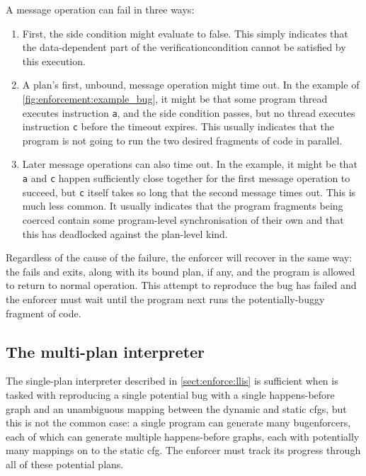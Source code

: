 A message operation can fail in three ways:
\begin{enumerate}
\item
  First, the side condition might evaluate to false.  This simply
  indicates that the data-dependent part of the
  \gls{verificationcondition} cannot be satisfied by this execution.

\item
  A plan's first, unbound, message operation might time out.  In the
  example of \autoref{fig:enforcement:example_bug}, it might be that
  some program thread executes instruction \texttt{a}, and the side
  condition passes, but no thread executes instruction \texttt{c}
  before the timeout expires.  This usually indicates that the program
  is not going to run the two desired fragments of code in parallel.

\item
  Later message operations can also time out.  In the example, it
  might be that \texttt{a} and \texttt{c} happen sufficiently close
  together for the first message operation to succeed, but \texttt{c}
  itself takes so long that the second message times out.  This is
  much less common.  It usually indicates that the program fragments
  being coerced contain some program-level synchronisation of their
  own and that this has deadlocked against the plan-level kind.
\end{enumerate}
Regardless of the cause of the failure, the enforcer will recover in
the same way: the fails and exits, along with its bound plan, if any,
and the program is allowed to return to normal operation.  This
attempt to reproduce the bug has failed and the enforcer must wait
until the program next runs the potentially-buggy fragment of code.

\subsection{The multi-plan interpreter}
\label{sect:enforce:succ}

The single-plan interpreter described in \autoref{sect:enforce:llis}
is sufficient when {\technique} is tasked with reproducing a single
potential bug with a single happens-before graph and an unambiguous
mapping between the dynamic and static \glspl{cfg}, but this is not
the common case: a single program can generate many
\glspl{bugenforcer}, each of which can generate multiple
happens-before graphs, each with potentially many mappings on to the
\gls{static cfg}.  The enforcer must track its progress through all of
these potential plans.

